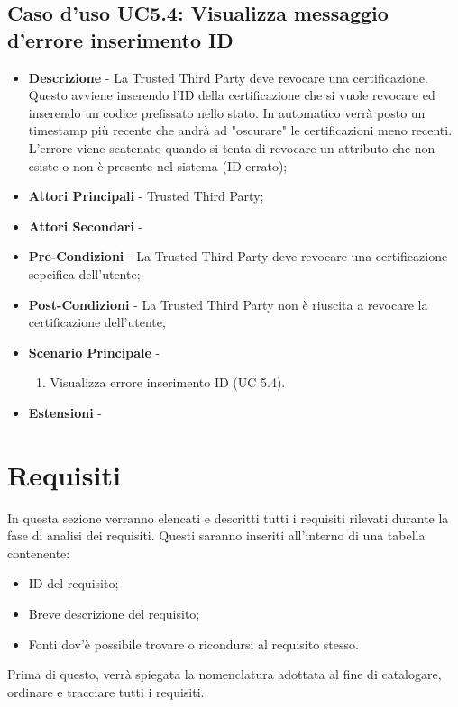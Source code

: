 \subsection{Caso d'uso UC5.4: Visualizza messaggio d'errore inserimento ID}
\begin{itemize}
	\item \textbf{Descrizione} - La Trusted Third Party deve revocare una certificazione.\\
	Questo avviene inserendo l'ID della certificazione che si vuole revocare ed inserendo un codice prefissato nello stato. In automatico verrà posto un timestamp più recente che andrà ad "oscurare" le certificazioni meno recenti.\\
	L'errore viene scatenato quando si tenta di revocare un attributo che non esiste o non è presente nel sistema (ID errato);	
	\item \textbf{Attori Principali} - Trusted Third Party;
	\item \textbf{Attori Secondari} -
	\item \textbf{Pre-Condizioni} - La Trusted Third Party deve revocare una certificazione sepcifica dell'utente;
	\item \textbf{Post-Condizioni} - La Trusted Third Party non è riuscita a revocare la certificazione dell'utente;
	\item \textbf{Scenario Principale} -
	\begin{enumerate}
		\item Visualizza errore inserimento ID (UC 5.4).
	\end{enumerate}
	\item \textbf{Estensioni} -
\end{itemize}
\section{Requisiti}
In questa sezione verranno elencati e descritti tutti i requisiti rilevati durante la fase di analisi dei requisiti. Questi saranno inseriti all'interno di una tabella contenente:
\begin{itemize}
	\item ID del requisito;
	\item Breve descrizione del requisito;
	\item Fonti dov'è possibile trovare o ricondursi al requisito stesso.
\end{itemize}
Prima di questo, verrà spiegata la nomenclatura adottata al fine di catalogare, ordinare e tracciare tutti i requisiti.
